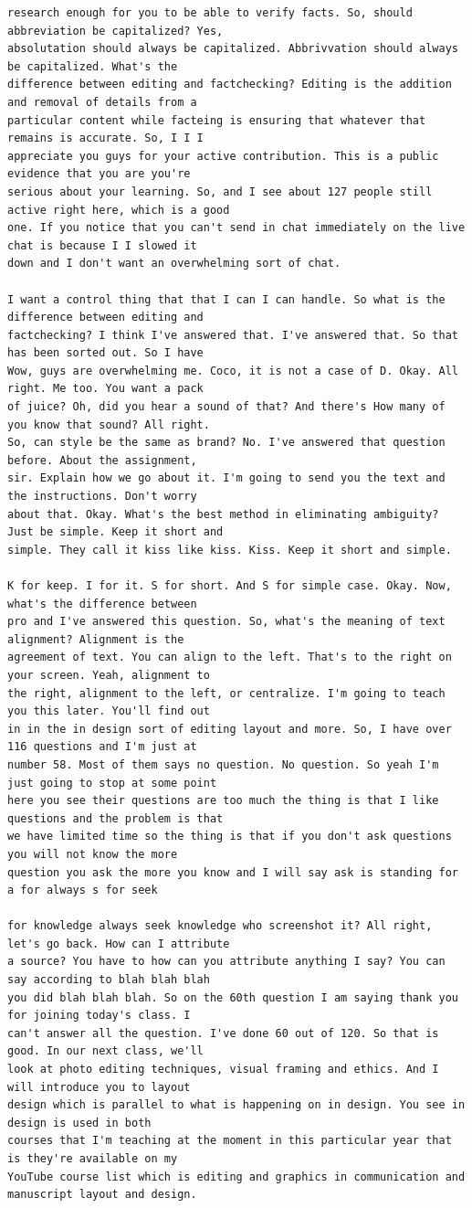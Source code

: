 {\begin{Verbatim}
research enough for you to be able to verify facts. So, should abbreviation be capitalized? Yes,
absolutation should always be capitalized. Abbrivvation should always be capitalized. What's the
difference between editing and factchecking? Editing is the addition and removal of details from a
particular content while facteing is ensuring that whatever that remains is accurate. So, I I I
appreciate you guys for your active contribution. This is a public evidence that you are you're
serious about your learning. So, and I see about 127 people still active right here, which is a good
one. If you notice that you can't send in chat immediately on the live chat is because I I slowed it
down and I don't want an overwhelming sort of chat.

I want a control thing that that I can I can handle. So what is the difference between editing and
factchecking? I think I've answered that. I've answered that. So that has been sorted out. So I have
Wow, guys are overwhelming me. Coco, it is not a case of D. Okay. All right. Me too. You want a pack
of juice? Oh, did you hear a sound of that? And there's How many of you know that sound? All right.
So, can style be the same as brand? No. I've answered that question before. About the assignment,
sir. Explain how we go about it. I'm going to send you the text and the instructions. Don't worry
about that. Okay. What's the best method in eliminating ambiguity? Just be simple. Keep it short and
simple. They call it kiss like kiss. Kiss. Keep it short and simple.

K for keep. I for it. S for short. And S for simple case. Okay. Now, what's the difference between
pro and I've answered this question. So, what's the meaning of text alignment? Alignment is the
agreement of text. You can align to the left. That's to the right on your screen. Yeah, alignment to
the right, alignment to the left, or centralize. I'm going to teach you this later. You'll find out
in in the in design sort of editing layout and more. So, I have over 116 questions and I'm just at
number 58. Most of them says no question. No question. So yeah I'm just going to stop at some point
here you see their questions are too much the thing is that I like questions and the problem is that
we have limited time so the thing is that if you don't ask questions you will not know the more
question you ask the more you know and I will say ask is standing for a for always s for seek

for knowledge always seek knowledge who screenshot it? All right, let's go back. How can I attribute
a source? You have to how can you attribute anything I say? You can say according to blah blah blah
you did blah blah blah. So on the 60th question I am saying thank you for joining today's class. I
can't answer all the question. I've done 60 out of 120. So that is good. In our next class, we'll
look at photo editing techniques, visual framing and ethics. And I will introduce you to layout
design which is parallel to what is happening on in design. You see in design is used in both
courses that I'm teaching at the moment in this particular year that is they're available on my
YouTube course list which is editing and graphics in communication and manuscript layout and design.


\end{Verbatim}}
